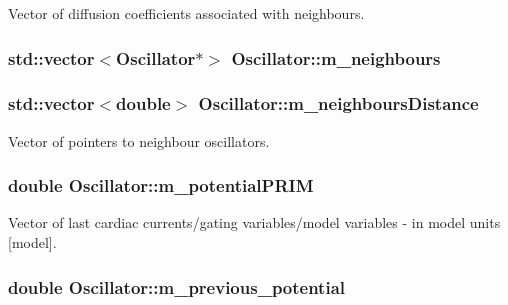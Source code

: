 Vector of diffusion coefficients associated with neighbours. 

\hypertarget{class_oscillator_ac6add7bad19c62071ad1ce651b815e4e}{
\subsubsection[{m\+\_\+neighbours}]{\setlength{\rightskip}{0pt plus 5cm}std\+::vector$<${\bf Oscillator}$\ast$$>$ Oscillator\+::m\+\_\+neighbours}}\label{class_oscillator_ac6add7bad19c62071ad1ce651b815e4e}
\hypertarget{class_oscillator_a7031173912bc2225997a3ab6f9995fec}{
\subsubsection[{m\+\_\+neighbours\+Distance}]{\setlength{\rightskip}{0pt plus 5cm}std\+::vector$<$double$>$ Oscillator\+::m\+\_\+neighbours\+Distance}}\label{class_oscillator_a7031173912bc2225997a3ab6f9995fec}


Vector of pointers to neighbour oscillators. 

\hypertarget{class_oscillator_aedf0974c19ea8428e3702f267cf45465}{
\subsubsection[{m\+\_\+potential\+P\+R\+I\+M}]{\setlength{\rightskip}{0pt plus 5cm}double Oscillator\+::m\+\_\+potential\+P\+R\+I\+M}}\label{class_oscillator_aedf0974c19ea8428e3702f267cf45465}


Vector of last cardiac currents/gating variables/model variables -\/ in model units \mbox{[}model\mbox{]}. 

\hypertarget{class_oscillator_a2a1649ababe43b1de3dbd6d5f24db703}{
\subsubsection[{m\+\_\+previous\+\_\+potential}]{\setlength{\rightskip}{0pt plus 5cm}double Oscillator\+::m\+\_\+previous\+\_\+potential}}\label{class_oscillator_a2a1649ababe43b1de3dbd6d5f24db703}


